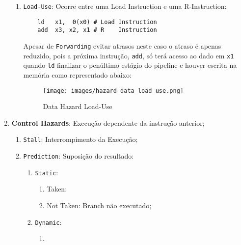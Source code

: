 \documentclass{article}
\begin{document}
\begin{enumerate}[rightmargin = \leftmargin]
\begin{enumerate}[rightmargin = \leftmargin]
        \item \texttt{Load-Use}: Ocorre entre uma Load Instruction e uma R-Instruction:
        \begin{scriptsize}
            \myStyleRISCV
            \begin{lstlisting}
    ld   x1,  0(x0) # Load Instruction
    add  x3, x2, x1 # R    Instruction
            \end{lstlisting}
        \end{scriptsize}
        Apesar de \texttt{Forwarding} evitar atrasos neste caso o atraso é apenas reduzido, pois a próxima instrução, \texttt{add}, só terá acesso ao dado em \texttt{x1} quando \texttt{ld} finalizar o penúltimo estágio do pipeline e houver escrita na memória como representado abaixo:
        \begin{figure}[H]
            \centering
            \texttt{[image: images/hazard\_data\_load\_use.png]}
            \caption{Data Hazard Load-Use}
            \label{hazardDataLoadUse}
        \end{figure}
    \end{enumerate}

    \item \textbf{Control Hazards}: Execução dependente da instrução anterior;
    \begin{enumerate}[rightmargin = \leftmargin]
        \item \texttt{Stall}: Interrompimento da Execução;

        \item \texttt{Prediction}: Suposição do resultado:
        \begin{enumerate}
            \item \texttt{Static}:
            \begin{enumerate}[noitemsep, rightmargin = \leftmargin]
                \item Taken:
                \item Not Taken: Branch não executado;
            \end{enumerate}
            \item \texttt{Dynamic}:
            \begin{enumerate}[noitemsep, rightmargin = \leftmargin]
                \item 
            \end{enumerate}
        \end{enumerate}
    \end{enumerate}
\end{enumerate}
\end{document}
